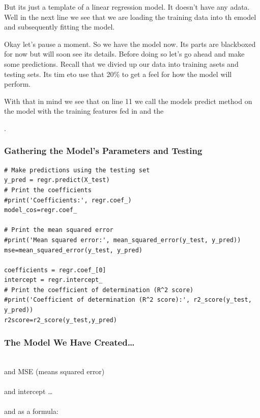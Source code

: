 \documentclass{beamer}
\newcounter{slidenum}
\begin{document}
\begin{frame}[fragile]
{{	But its just a template of a linear regression model. It doesn't have any adata. 
	Well in the next line we see that we are loading the training data into th emodel and
	subsequently fitting the model. 

	Okay let's pause a moment. So we have the model now. Its parts are blackboxed for now but
	will soon see its details. 
	Before doing so let's go ahead and make some predictions. 
Recall that we divied up our data into training asets and testing sets. Its tim eto use that 20\% to
get a feel for how the model will perform. 

With that in mind we see that on line 11 we call the models predict method on the model with the
training features fed in and the 

}}.

\end{frame}

\begin{frame}[fragile]
	\frametitle{Gathering the Model's Parameters and Testing}
	\begin{lstlisting}[firstnumber=12]
# Make predictions using the testing set
y_pred = regr.predict(X_test)
# Print the coefficients
#print('Coefficients:', regr.coef_)
model_cos=regr.coef_

# Print the mean squared error
#print('Mean squared error:', mean_squared_error(y_test, y_pred))
mse=mean_squared_error(y_test, y_pred)

coefficients = regr.coef_[0]
intercept = regr.intercept_
# Print the coefficient of determination (R^2 score)
#print('Coefficient of determination (R^2 score):', r2_score(y_test, y_pred))
r2score=r2_score(y_test,y_pred)
	\end{lstlisting}
\end{frame}

\begin{frame}
	\frametitle{The Model We Have Created\ldots}
	\\
	and MSE (means squared error)\\\
	\\
	and intercept \ldots\\
	\\
	and as a formula:\\
\end{frame}
\end{document}
